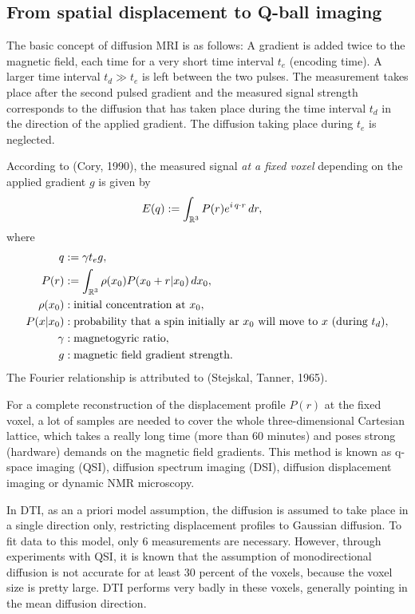 
\subsection{From spatial displacement to Q-ball imaging}

The basic concept of diffusion MRI is as follows:
A gradient is added twice to the magnetic field, each time for a very short
time interval $t_e$ (encoding time).
A larger time interval $t_d \gg t_e$ is left between the two pulses.
The measurement takes place after the second pulsed gradient and the measured
signal strength corresponds to the diffusion that has taken place during the
time interval $t_d$ in the direction of the applied gradient.
The diffusion taking place during $t_e$ is neglected.

According to (Cory, 1990), the measured signal \emph{at a fixed voxel}
depending on the applied gradient $g$ is given by 
\begin{align}
    E(q) &:= \int_{\mathbb{R}^3} P(r) e^{i \, q \cdot r} \,dr,
\end{align}
where
\begin{align}
    q &:= \gamma t_e g, \\
    P(r) &:= \int_{\IR^3} \rho(x_0) P(x_0 + r|x_0) \,dx_0, \\
    \rho(x_0) &: \text{initial concentration at $x_0$}, \\
    P(x|x_0) &: \text{%
        probability that a spin initially ar $x_0$
        will move to $x$ (during $t_d$)%
    }, \\
    \gamma &: \text{magnetogyric ratio}, \\
    g &: \text{magnetic field gradient strength}.
\end{align}
The Fourier relationship is attributed to (Stejskal, Tanner, 1965).

For a complete reconstruction of the displacement profile $P(r)$ at the fixed
voxel, a lot of samples are needed to cover the whole three-dimensional Cartesian
lattice, which takes a really long time (more than 60 minutes) and poses
strong (hardware) demands on the magnetic field gradients.
This method is known as q-space imaging (QSI), diffusion spectrum imaging (DSI),
diffusion displacement imaging or dynamic NMR microscopy.

In DTI, as an a priori model assumption, the diffusion is assumed to take place
in a single direction only, restricting displacement profiles to Gaussian
diffusion.
To fit data to this model, only 6 measurements are necessary.
However, through experiments with QSI, it is known that the assumption of
monodirectional diffusion is not accurate for at least 30 percent of the voxels,
because the voxel size is pretty large.
DTI performs very badly in these voxels, generally pointing in the mean diffusion
direction.

